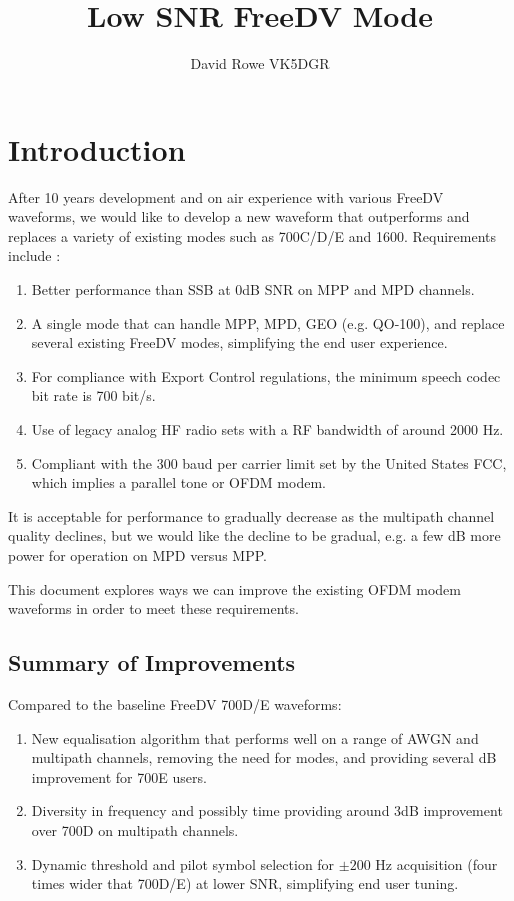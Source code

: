 \documentclass{article}
\begin{document}
\title{Low SNR FreeDV Mode}
\author{David Rowe VK5DGR}
\maketitle

\section{Introduction}

After 10 years development and on air experience with various FreeDV waveforms, we would like to develop a new waveform that outperforms and replaces a variety of existing modes such as 700C/D/E and 1600.  Requirements include \cite{freedv-020}:
\begin{enumerate}
\item Better performance than SSB at 0dB SNR on MPP and MPD channels.
\item A single mode that can handle MPP, MPD, GEO (e.g. QO-100), and replace several existing FreeDV modes, simplifying the end user experience.
\item For compliance with Export Control regulations, the minimum speech codec bit rate is 700 bit/s.
\item Use of legacy analog HF radio sets with a RF bandwidth of around 2000 Hz.
\item Compliant with the 300 baud per carrier limit set by the United States FCC, which implies a parallel tone or OFDM modem. 
\end{enumerate}
It is acceptable for performance to gradually decrease as the multipath channel quality declines, but we would like the decline to be gradual, e.g. a few dB more power for operation on MPD versus MPP.

This document explores ways we can improve the existing OFDM modem waveforms in order to meet these requirements.

\subsection{Summary of Improvements}

Compared to the baseline FreeDV 700D/E waveforms:
\begin{enumerate}
\item New equalisation algorithm that performs well on a range of AWGN and multipath channels, removing the need for modes, and providing several dB improvement for 700E users.
\item Diversity in frequency and possibly time providing around 3dB improvement over 700D on multipath channels.  
\item Dynamic threshold and pilot symbol selection for $\pm 200$ Hz acquisition  (four times wider that 700D/E) at lower SNR, simplifying end user tuning.
\end{enumerate}
\end{document}
